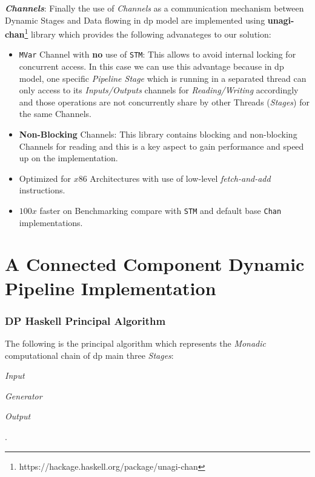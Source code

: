 \documentclass[preprint]{elsarticle}
\begin{document}
\textbf{\textit{Channels}}\label{section:channels}: Finally the use of \emph{Channels} as a communication mechanism between Dynamic Stages and Data flowing in \acrshort{dp} model are implemented using \textbf{unagi-chan}\footnote{https://hackage.haskell.org/package/unagi-chan} library which provides the following advanateges to our solution:

\begin{itemize}
  \item \texttt{MVar} Channel with \textbf{no} use of \texttt{STM}: This allows to avoid internal locking for concurrent access. In this case
  we can use this advantage because in \acrshort{dp} model, one specific \textit{Pipeline Stage} which is running in a separated thread can only access to its \textit{Inputs/Outputs} channels for \textit{Reading/Writing} accordingly 
  and those operations are not concurrently share by other Threads (\textit{Stages}) for the same Channels.  
  \item \textbf{Non-Blocking} Channels: This library contains blocking and non-blocking Channels for reading and this is a key aspect to gain performance and speed up on the implementation.
  \item Optimized for $x86$ Architectures with use of low-level \textit{fetch-and-add} instructions.
  \item $100x$ faster on Benchmarking compare with \texttt{STM} and default base \texttt{Chan} implementations.
\end{itemize}

\section{A Connected Component Dynamic Pipeline Implementation}
\subsubsection{\textbf{DP Haskell Principal Algorithm}}
The following is the principal algorithm which represents the \textit{Monadic} computational chain of \acrshort{dp} main three \textit{Stages}: \begin{inparaenum}[i\upshape)]
\item \emph{Input}
\item \emph{Generator}
\item \emph{Output}
 \end{inparaenum}.
\end{document}
